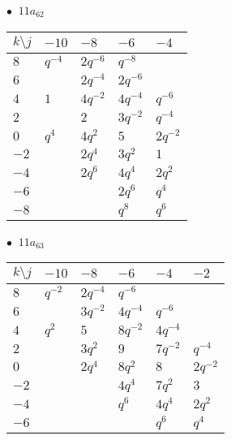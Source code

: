 \begin{minipage}{\linewidth}
$\bullet\ $ $11a_{62}$ \vspace{0.5em} \\
\begin{tabular}{l|llll}
$k \setminus j$ & $-10$ & $-8$ & $-6$ & $-4$ \\
\hline
$8$ & $q^{-4}$ & $2q^{-6}$ & $q^{-8}$ &  \\
$6$ &  & $2q^{-4}$ & $2q^{-6}$ &  \\
$4$ & $1$ & $4q^{-2}$ & $4q^{-4}$ & $q^{-6}$ \\
$2$ &  & $2$ & $3q^{-2}$ & $q^{-4}$ \\
$0$ & $q^{4}$ & $4q^{2}$ & $5$ & $2q^{-2}$ \\
$-2$ &  & $2q^{4}$ & $3q^{2}$ & $1$ \\
$-4$ &  & $2q^{6}$ & $4q^{4}$ & $2q^{2}$ \\
$-6$ &  &  & $2q^{6}$ & $q^{4}$ \\
$-8$ &  &  & $q^{8}$ & $q^{6}$ \\
\end{tabular}
\vspace{2em}
\end{minipage}
%
\begin{minipage}{\linewidth}
$\bullet\ $ $11a_{63}$ \vspace{0.5em} \\
\begin{tabular}{l|lllll}
$k \setminus j$ & $-10$ & $-8$ & $-6$ & $-4$ & $-2$ \\
\hline
$8$ & $q^{-2}$ & $2q^{-4}$ & $q^{-6}$ &  &  \\
$6$ &  & $3q^{-2}$ & $4q^{-4}$ & $q^{-6}$ &  \\
$4$ & $q^{2}$ & $5$ & $8q^{-2}$ & $4q^{-4}$ &  \\
$2$ &  & $3q^{2}$ & $9$ & $7q^{-2}$ & $q^{-4}$ \\
$0$ &  & $2q^{4}$ & $8q^{2}$ & $8$ & $2q^{-2}$ \\
$-2$ &  &  & $4q^{4}$ & $7q^{2}$ & $3$ \\
$-4$ &  &  & $q^{6}$ & $4q^{4}$ & $2q^{2}$ \\
$-6$ &  &  &  & $q^{6}$ & $q^{4}$ \\
\end{tabular}
\vspace{2em}
\end{minipage}
%
